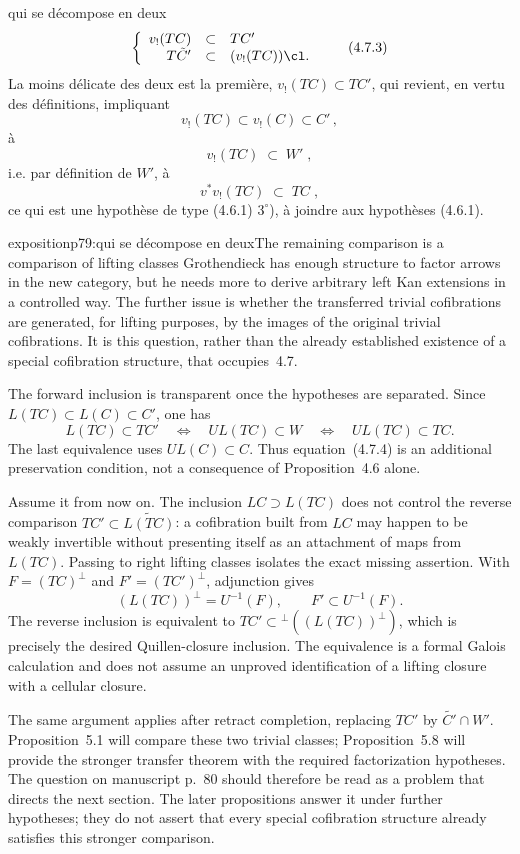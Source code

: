 qui se décompose en deux
\[
\left\{
\begin{array}{rcl}
v_{!}(TC) & \subset & TC' \\
T\tilde{C}' & \subset & (v_{!}(TC))\cl.
\end{array}
\right.
\tag*{(4.7.3)}
\]
La moins délicate des deux est la  première, $v_{!}(TC) \subset TC'$, qui revient, en vertu des définitions, impliquant
\[
v_{!}(TC) \subset v_{!}(C) \subset C' \, ,
\]
à
\[
v_{!}(TC) \;\subset\; W' \; ,
\]
i.e. par définition de $W'$, à
\[
v^{*}v_{!}(TC) \;\subset\; TC \; ,
\tag*{(4.7.4)}
\]
ce qui est une hypothèse de type (4.6.1) $3^{\circ}$), à joindre aux hypothèses (4.6.1).

\begin{dcomment}{exposition}{p79:qui se décompose en deux}{The remaining comparison is a comparison of lifting classes}
Grothendieck has enough structure to factor arrows in the new category, but he needs more to derive arbitrary left Kan extensions in a controlled way. The further issue is whether the transferred trivial cofibrations are generated, for lifting purposes, by the images of the original trivial cofibrations. It is this question, rather than the already established existence of a special cofibration structure, that occupies~4.7.

The forward inclusion is transparent once the hypotheses are separated. Since $L(TC)\subset L(C)\subset C'$, one has
\[
 L(TC)\subset TC'
 \quad\Longleftrightarrow\quad UL(TC)\subset W
 \quad\Longleftrightarrow\quad UL(TC)\subset TC.
\]
The last equivalence uses $UL(C)\subset C$. Thus equation~(4.7.4) is an additional preservation condition, not a consequence of Proposition~4.6 alone.

Assume it from now on. The inclusion $LC\supset L(TC)$ does not control the reverse comparison $TC'\subset\widetilde{L(TC)}$: a cofibration built from $LC$ may happen to be weakly invertible without presenting itself as an attachment of maps from $L(TC)$. Passing to right lifting classes isolates the exact missing assertion. With $F=(TC)^{\perp}$ and $F'=(TC')^{\perp}$, adjunction gives
\[
 (L(TC))^{\perp}=U^{-1}(F),\qquad
 F'\subset U^{-1}(F).
\]
The reverse inclusion is equivalent to $TC'\subset{}^{\perp}((L(TC))^{\perp})$, which is precisely the desired Quillen-closure inclusion. The equivalence is a formal Galois calculation and does not assume an unproved identification of a lifting closure with a cellular closure.

The same argument applies after retract completion, replacing $TC'$ by $\widetilde{C'}\cap W'$. Proposition~5.1 will compare these two trivial classes; Proposition~5.8 will provide the stronger transfer theorem with the required factorization hypotheses. The question on manuscript p.~80 should therefore be read as a problem that directs the next section. The later propositions answer it under further hypotheses; they do not assert that every special cofibration structure already satisfies this stronger comparison.
\end{dcomment}


